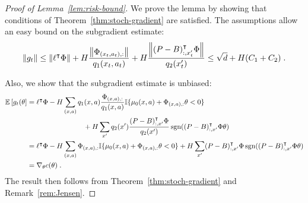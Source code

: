 \documentclass[11pt]{article}
\newcounter{assumption}%
\begin{document}
\begin{proof}[Proof of Lemma~\ref{lem:risk-bound}]
  We prove the lemma by showing that conditions of Theorem~\ref{thm:stoch-gradient} are satisfied. The assumptions allow an easy bound on the subgradient estimate:
\[
\left\Vert g_t\right\Vert \le \left\Vert\ell^\intercal \Phi\right\Vert + H \frac{\left\Vert\Phi_{(x_t,a_t),:}\right\Vert }{q_1(x_t,a_t)} + H  \frac{\left\Vert(P-B)_{:,x_t'}^\intercal \Phi\right\Vert}{q_2(x_t')} \le \sqrt{d} + H (C_1 + C_2) \; .
\]

Also, we show that the subgradient estimate is unbiased:
\begin{align*}
\operatorname*{\mathbb E}\left[g_t(\theta\right] &= \ell^\intercal \Phi - H \sum_{(x,a)} q_1(x,a) \frac{\Phi_{(x,a),:}}{q_1(x,a)} {\mathbb I}{\{\mu_0(x,a)+\Phi_{(x,a),:} \theta < 0\}} \\
&\qquad\qquad\qquad\qquad+ H \sum_{x'} q_2(x') \frac{(P-B)_{:,x'}^\intercal \Phi}{q_2(x')} \operatorname*{sgn}((P-B)_{:,x'}^\intercal \Phi \theta) \\
&= \ell^\intercal \Phi - H \sum_{(x,a)} \Phi_{(x,a),:} {\mathbb I}{\{\mu_0(x,a)+\Phi_{(x,a),:} \theta < 0\}}+ H \sum_{x'}  (P-B)_{:,x'}^\intercal \Phi \operatorname*{sgn}((P-B)_{:,x'}^\intercal \Phi \theta) \\
&= \nabla_{\theta} c(\theta) \; .
\end{align*}
The result then follows from Theorem~\ref{thm:stoch-gradient} and Remark~\ref{rem:Jensen}.


\end{proof}
\end{document}
